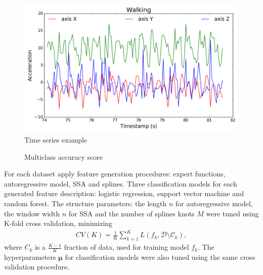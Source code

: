 \begin{figure}[!h]
	\centering
	\includegraphics[width=1\linewidth]{pics/Fig3.png}
	\caption{Time series example}
	\label{fig::ts_example}
\end{figure}

\begin{figure}[!h]
	\centering
	\caption{Multiclass accuracy score}
	\label{fig::accuracy_results}
\end{figure}

For each dataset apply feature generation procedures: expert functions, autoregressive model, SSA and splines. 
Three classification models for each generated feature description: logistic regression, support vector machine and random forest. 
The structure parameters: the length $n$ for autoregressive model, the window width $n$ for SSA and the number of splines knots $M$ were tuned using K-fold cross validation, minimizing
\begin{align}\label{cv}
CV(K) = \frac{1}{K}\sum_{k=1}^{K} L(f_k, \mathcal{D}\setminus \mathcal{C}_k),
\end{align}
where $C_k$ is a $\frac{K-1}{K}$ fraction of data, used for training model $f_k$.
The hyperparameters $\bm{\mu}$ for classification models were also tuned using the same cross validation procedure. 


